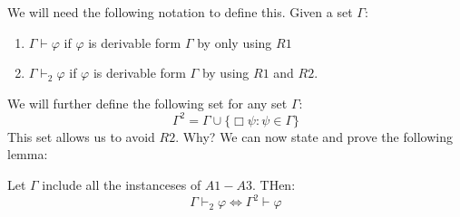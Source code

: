 \documentclass[../main.tex]{subfiles}
\begin{document}
We will need the following notation to
define this. Given a set $\Gamma$:
\begin{enumerate}
	\item $\Gamma\vdash\varphi$ if $\varphi$ is derivable form $\Gamma$ by
		only using $R1$
	\item $\Gamma\vdash_2\varphi$ if $\varphi$ is derivable form $\Gamma$ by
		using $R1$ and $R2$.
\end{enumerate}
We will further define the following set for any set $\Gamma$:
\[
	\Gamma^2=\Gamma\cup\{\Box\psi:\psi\in\Gamma\}
\]
This set allows us to avoid $R2$. Why?
We can now state and prove the following lemma:
\begin{lem}
	Let $\Gamma$ include all the instanceses of $A1-A3$. THen:
	\[
		\Gamma\vdash_2\varphi\Leftrightarrow\Gamma^2\vdash\varphi
	\]
\end{lem}
\end{document}
